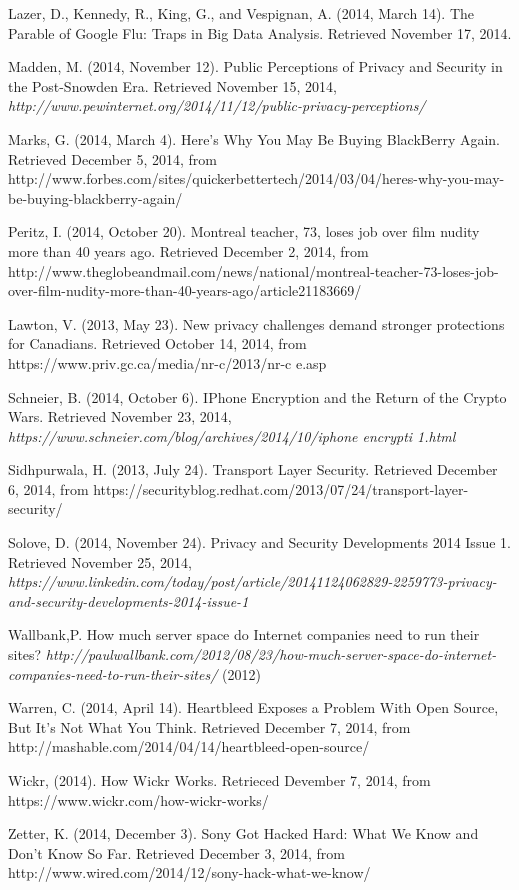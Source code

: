 \documentclass[12pt]{article}
\begin{document}
\begin{thebibliography}{99}
	Lazer, D., Kennedy, R., King, G., and Vespignan, A. (2014, March 14). The Parable of Google Flu: Traps in Big Data Analysis. Retrieved November 17, 2014.

	Madden, M. (2014, November 12). Public Perceptions of Privacy and Security in the Post-Snowden Era. Retrieved November 15, 2014, {\sl http://www.pewinternet.org/2014/11/12/public-privacy-perceptions/}

	Marks, G. (2014, March 4). Here's Why You May Be Buying BlackBerry Again. Retrieved December 5, 2014, from http://www.forbes.com/sites/quickerbettertech/2014/03/04/heres-why-you-may-be-buying-blackberry-again/

	Peritz, I. (2014, October 20). Montreal teacher, 73, loses job over film nudity more than 40 years ago. Retrieved December 2, 2014, from http://www.theglobeandmail.com/news/national/montreal-teacher-73-loses-job-over-film-nudity-more-than-40-years-ago/article21183669/

	Lawton, V. (2013, May 23). New privacy challenges demand stronger protections for Canadians. Retrieved October 14, 2014, from https://www.priv.gc.ca/media/nr-c/2013/nr-c \textunderscore e.asp

	Schneier, B. (2014, October 6). IPhone Encryption and the Return of the Crypto Wars. Retrieved November 23, 2014, {\sl https://www.schneier.com/blog/archives/2014/10/iphone \textunderscore encrypti \textunderscore 1.html}

	Sidhpurwala, H. (2013, July 24). Transport Layer Security. Retrieved December 6, 2014, from https://securityblog.redhat.com/2013/07/24/transport-layer-security/

	Solove, D. (2014, November 24). Privacy and Security Developments 2014 Issue 1. Retrieved November 25, 2014, {\sl https://www.linkedin.com/today/post/article/20141124062829-2259773-privacy-and-security-developments-2014-issue-1}

	Wallbank,P. How much server space do Internet companies need to run their sites? {\sl http://paulwallbank.com/2012/08/23/how-much-server-space-do-internet-companies-need-to-run-their-sites/} (2012)

	Warren, C. (2014, April 14). Heartbleed Exposes a Problem With Open Source, But It's Not What You Think. Retrieved December 7, 2014, from http://mashable.com/2014/04/14/heartbleed-open-source/

	Wickr, (2014). How Wickr Works. Retrieced Devember 7, 2014, from https://www.wickr.com/how-wickr-works/

	Zetter, K. (2014, December 3). Sony Got Hacked Hard: What We Know and Don’t Know So Far. Retrieved December 3, 2014, from http://www.wired.com/2014/12/sony-hack-what-we-know/

\end{thebibliography}
\end{document}
